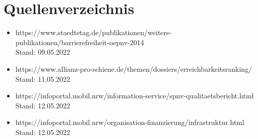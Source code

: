 \documentclass[a4paper,12pt]{scrartcl}
\begin{document}
\newpage
\section{Quellenverzeichnis}
\begin{itemize}
\item https://www.staedtetag.de/publikationen/weitere-publikationen/barrierefreiheit-oepnv-2014 \\ Stand: 09.05.2022
\item https://www.allianz-pro-schiene.de/themen/dossiers/erreichbarkeitsranking/ \\ Stand: 11.05.2022
\item https://infoportal.mobil.nrw/information-service/spnv-qualitaetsbericht.html \\ Stand: 12.05.2022
\item https://infoportal.mobil.nrw/organisation-finanzierung/infrastruktur.html \\ Stand: 12.05.2022
\end{itemize}
\end{document}
